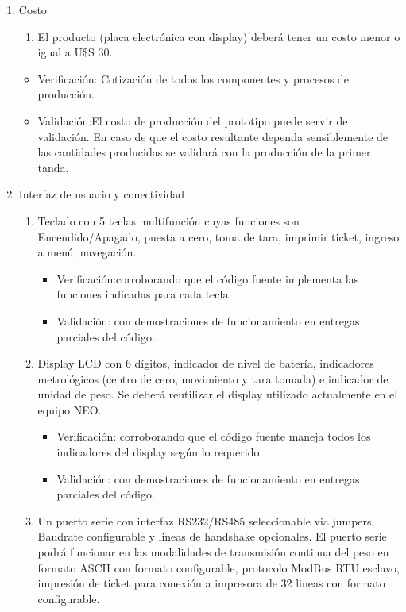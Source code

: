 \documentclass[11pt]{charter}
\begin{document}
\begin{enumerate}
\item Costo
	\begin{enumerate}
	\item El producto (placa electrónica con display) deberá tener un costo menor o igual a U\$S 30. %
	\end{enumerate}
	
\begin{itemize}
\item Verificación: Cotización de todos los componentes y procesos de producción.
\item Validación:El costo de producción del prototipo puede servir de validación. En caso de que el costo resultante dependa sensiblemente de las cantidades producidas se validará con la producción de la primer tanda.
\end{itemize}
	
\item Interfaz de usuario y conectividad
	\begin{enumerate}
	\item Teclado con 5 teclas multifunción cuyas funciones son Encendido/Apagado, puesta a cero, toma de tara, imprimir ticket, ingreso a menú, navegación.
	
\begin{itemize}
\item Verificación:corroborando que el código fuente implementa las funciones indicadas para cada tecla.
\item Validación: con demostraciones de funcionamiento en entregas parciales del código.
\end{itemize}
	
	\item Display LCD con 6 dígitos, indicador de nivel de batería, indicadores metrológicos (centro de cero, movimiento y tara tomada) e indicador de unidad de peso. Se deberá reutilizar el display utilizado actualmente en el equipo NEO.

\begin{itemize}
\item Verificación: corroborando que el código fuente maneja todos los indicadores del display según  lo requerido.
\item Validación: con demostraciones de funcionamiento en entregas parciales del código.
\end{itemize}	
	
	\item Un puerto serie con interfaz RS232/RS485 seleccionable via jumpers, Baudrate configurable y lineas de handshake opcionales. El puerto serie podrá funcionar en las modalidades de transmisión continua del peso en formato ASCII con formato configurable, protocolo ModBus RTU esclavo, impresión de ticket para conexión a impresora de 32 lineas con formato configurable. 
	

\end{enumerate}
\end{enumerate}
\end{document}
